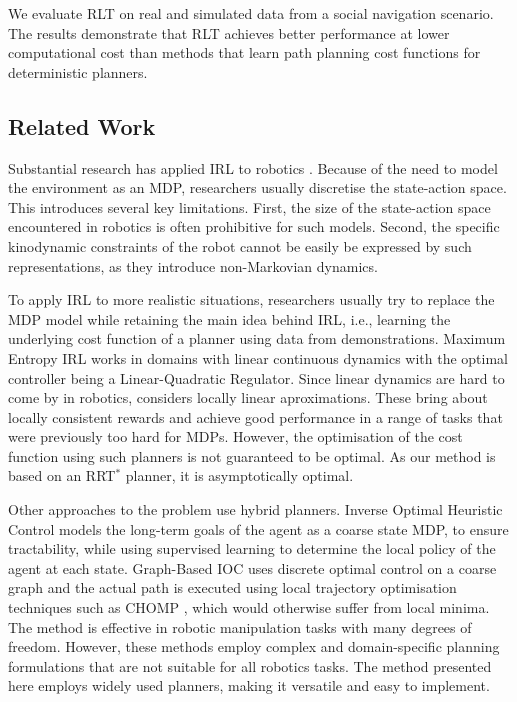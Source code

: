 \documentclass[a4paper,11pt]{report}
\begin{document}
We evaluate RLT on real and simulated data from a social navigation scenario. The results demonstrate that RLT achieves better performance at lower computational cost than methods that learn path planning cost functions for deterministic planners.

\subsection{Related Work}


Substantial research has applied IRL to robotics \cite{henry2010learning,abbeel2008apprenticeship,vasquez2014inverse}. Because of the need to model the environment as an MDP, researchers usually discretise the state-action space. This introduces several key limitations. First, the size of the state-action space encountered in robotics is often prohibitive for such models. Second, the specific kinodynamic constraints of the robot cannot be easily be expressed by such representations, as they introduce non-Markovian dynamics. 


To apply IRL to more realistic situations, researchers usually try to replace the MDP model while retaining the main idea behind IRL, i.e., learning the underlying cost function of a planner using data from demonstrations. Maximum Entropy IRL \cite{ziebart2010modelingthesis} works in domains with linear continuous dynamics with the optimal controller being a Linear-Quadratic Regulator. Since linear dynamics are hard to come by in robotics, \cite{2012-cioc} considers locally linear aproximations. These bring about locally consistent rewards and achieve good performance in a range of tasks that were previously too hard for MDPs. However, the optimisation of the cost function using such planners is not guaranteed to be optimal. As our method is based on an RRT$^*$ planner, it is asymptotically optimal.

Other approaches to the problem use hybrid planners. Inverse Optimal Heuristic Control \cite{ratliff2009inverse} models the long-term goals of the agent as a coarse state MDP, to ensure tractability, while using supervised learning to determine the local policy of the agent at each state. Graph-Based IOC \cite{byravan2015graph} uses discrete optimal control on a coarse graph and the actual path is executed using local trajectory optimisation techniques such as CHOMP \cite{ratliff2009chomp}, which would otherwise suffer from local minima. The method is effective in robotic manipulation tasks with many degrees of freedom.  However, these methods employ complex and domain-specific planning formulations that are not suitable for all robotics tasks. The method presented here employs widely used planners, making it versatile and easy to implement. 
\end{document}

